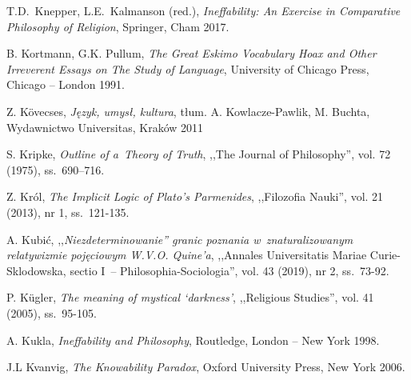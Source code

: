 \begin{thebibliography}{100}

T.D.~Knepper, L.E.~Kalmanson (red.), \textit{Ineffability: An Exercise in Comparative Philosophy of Religion}, Springer, Cham 2017.

B. Kortmann, G.K. Pullum, \textit{The Great Eskimo Vocabulary Hoax and Other Irreverent Essays on The Study of Language}, University of Chicago Press, Chicago -- London 1991.

Z. Kövecses, \textit{Język, umysł, kultura}, tłum. A. Kowlacze-Pawlik, M. Buchta, Wydawnictwo Universitas, Kraków 2011


S. Kripke, \textit{Outline of a~Theory of Truth}, ,,The Journal of Philosophy'', vol. 72 (1975), ss.~690–716.

Z. Król, \textit{The Implicit Logic of Plato's Parmenides}, ,,Filozofia Nauki'', vol. 21 (2013), nr 1, ss.~121-135.

A. Kubić, ,,\textit{Niezdeterminowanie'' granic poznania w~znaturalizowanym relatywizmie pojęciowym W.V.O. Quine'a},
,,Annales Universitatis Mariae Curie-Sklodowska, sectio I~-- Philosophia-Sociologia'', vol. 43 (2019), nr 2, ss.~73-92.


P. Kügler, \textit{The meaning of mystical ‘darkness'}, ,,Religious Studies'', vol. 41 (2005),  ss.~95-105.

A. Kukla, \textit{Ineffability and Philosophy}, Routledge, London -- New York 1998.

J.L Kvanvig, \textit{The Knowability Paradox}, Oxford University Press, New York 2006.


\end{thebibliography}
